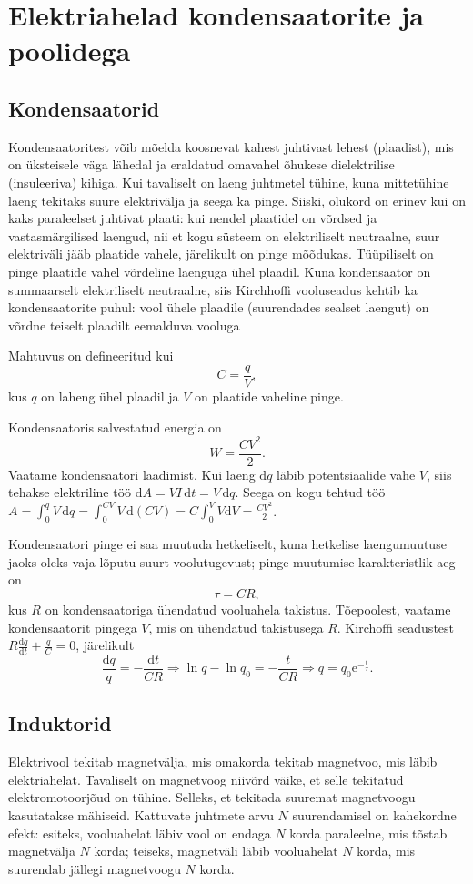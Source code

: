 \documentclass[a4paper,11pt,twocolumn]{article}
\begin{document}
\section{Elektriahelad kondensaatorite ja poolidega}
\subsection{Kondensaatorid}
Kondensaatoritest võib mõelda koosnevat kahest juhtivast lehest (plaadist), mis on üksteisele väga lähedal ja eraldatud omavahel õhukese dielektrilise (insuleeriva) kihiga.
Kui tavaliselt on laeng juhtmetel tühine, kuna mittetühine laeng tekitaks suure elektrivälja ja seega ka pinge.
Siiski, olukord on erinev kui on kaks paraleelset juhtivat plaati: kui nendel plaatidel on võrdsed ja vastasmärgilised laengud, nii et kogu süsteem on elektriliselt neutraalne, suur elektriväli jääb plaatide vahele, järelikult on pinge mõõdukas.
Tüüpiliselt on pinge plaatide vahel võrdeline laenguga ühel plaadil.
Kuna kondensaator on summaarselt elektriliselt neutraalne, siis Kirchhoffi vooluseadus kehtib ka kondensaatorite puhul: vool ühele plaadile (suurendades sealset laengut) on võrdne teiselt plaadilt eemalduva vooluga

Mahtuvus on defineeritud kui
\[
C=\frac{q}{V}
,\] kus $q$ on laheng ühel plaadil ja $V$ on plaatide vaheline pinge.

Kondensaatoris salvestatud energia on
\[
W=\frac{CV^2}{2}
.\]
Vaatame kondensaatori laadimist. Kui laeng $\mathrm{d}q$ läbib potentsiaalide vahe $V$, siis tehakse elektriline töö $\mathrm{d}A=VI\,\mathrm{d}t=V\,\mathrm{d}q$. Seega on kogu tehtud töö $A= \int_0^{q} V \, \mathrm{d}q=\int_0^{CV}V\, \mathrm{d}(CV)=C\int_0^{V} V \mathrm{d}V=\frac{CV^2}{2}$.

Kondensaatori pinge ei saa muutuda hetkeliselt, kuna hetkelise laengumuutuse jaoks oleks vaja lõputu suurt voolutugevust; pinge muutumise karakteristlik aeg on
\[
\tau =CR
,\] kus $R$ on kondensaatoriga ühendatud vooluahela takistus.
Tõepoolest, vaatame kondensaatorit pingega $V$, mis on ühendatud takistusega $R$. Kirchoffi seadustest $R \frac{\mathrm{d}q}{\mathrm{d}t} + \frac{q}{C}=0$, järelikult
\[
\frac{\mathrm{d} q}{q}=-\frac{\mathrm{d} t}{C R} \Rightarrow \ln q-\ln q_{0}=-\frac{t}{C R} \Rightarrow q=q_{0} \mathrm{e}^{-\frac{t}{\tau}}
.\]

\subsection{Induktorid}
Elektrivool tekitab magnetvälja, mis omakorda tekitab magnetvoo, mis läbib elektriahelat.
Tavaliselt on magnetvoog niivõrd väike, et selle tekitatud elektromotoorjõud on tühine.
Selleks, et tekitada suuremat magnetvoogu kasutatakse mähiseid.
Kattuvate juhtmete arvu $N$ suurendamisel on kahekordne efekt: esiteks, vooluahelat läbiv vool on endaga $N$ korda paraleelne, mis tõstab magnetvälja $N$ korda; teiseks, magnetväli läbib vooluahelat $N$ korda, mis suurendab jällegi magnetvoogu $N$ korda.
\end{document}
